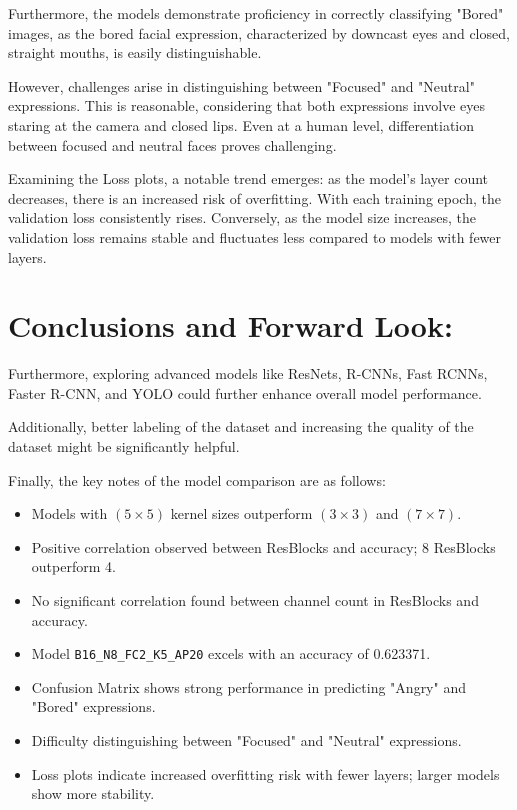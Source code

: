 Furthermore, the models demonstrate proficiency in correctly classifying "Bored" images, as the bored facial expression, characterized by downcast eyes and closed, straight mouths, is easily distinguishable.

However, challenges arise in distinguishing between "Focused" and "Neutral" expressions. This is reasonable, considering that both expressions involve eyes staring at the camera and closed lips. Even at a human level, differentiation between focused and neutral faces proves challenging.

Examining the Loss plots, a notable trend emerges: as the model's layer count decreases, there is an increased risk of overfitting. With each training epoch, the validation loss consistently rises. Conversely, as the model size increases, the validation loss remains stable and fluctuates less compared to models with fewer layers.


\section{Conclusions and Forward Look:}

Furthermore, exploring advanced models like ResNets, R-CNNs, Fast RCNNs, Faster R-CNN, and YOLO could further enhance overall model performance.


Additionally, better labeling of the dataset and increasing the quality of the dataset might be significantly helpful.

Finally, the key notes of the model comparison are as follows:

\begin{itemize}
	\item Models with $(5\times5)$ kernel sizes outperform $(3\times3)$ and $(7\times7)$.
	\item Positive correlation observed between ResBlocks and accuracy; 8 ResBlocks outperform 4.
	\item No significant correlation found between channel count in ResBlocks and accuracy.
	\item Model \texttt{B16\_N8\_FC2\_K5\_AP20} excels with an accuracy of 0.623371.
	\item Confusion Matrix shows strong performance in predicting "Angry" and "Bored" expressions.
	\item Difficulty distinguishing between "Focused" and "Neutral" expressions.
	\item Loss plots indicate increased overfitting risk with fewer layers; larger models show more stability.
\end{itemize}



